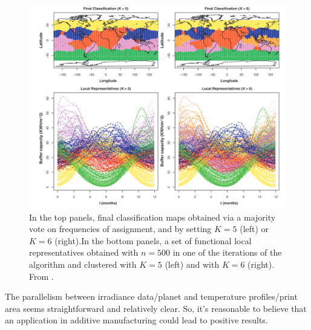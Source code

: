 \begin{figure}
    \centering
    \includegraphics[scale=0.4]{Images/resbagging.png}
    \caption[Classification of irradiance data.]{In the top panels, final classification maps obtained via a majority vote on frequencies of assignment, and by setting $K = 5$ (left) or $K = 6$ (right).In the bottom panels, a set of functional local representatives obtained with $n = 500$ in one of the iterations of the algorithm and clustered with $K = 5$ (left) and with $K=6$ (right). From \citeauthor{secchi_bagging_2013} \citeyear{secchi_bagging_2013}.}
    \label{fig:resbagging}
\end{figure}
The parallelism between irradiance data/planet and temperature profiles/print area seems straightforward and relatively clear. So, it's reasonable to believe that an application in additive manufacturing could lead to positive results.

